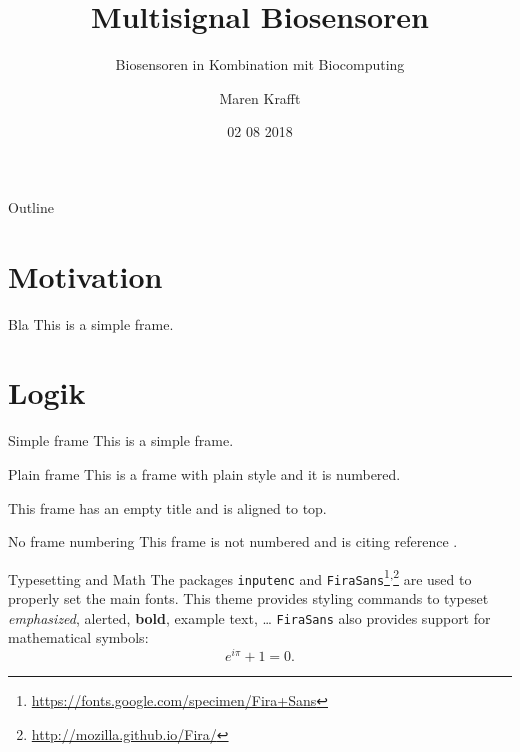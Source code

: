 \documentclass{beamer}
\title{Multisignal Biosensoren}
\subtitle{Biosensoren in Kombination mit Biocomputing}
\author{Maren Krafft}
\institute{Universit{\"A}t Passau \\ Lehrstuhl f{\"u}r technische Informatik}
\date{02 08 2018}
\begin{document}
    	\begin{frame}
        	\maketitle
    	\end{frame}
   
    \begin{frame}{Outline}
    \tableofcontents
	\end{frame}

 	\section{Motivation}
 	\begin{frame}{Bla}
 	This is a simple frame.
 	\end{frame}
 
 	\section{Logik}
    \begin{frame}{Simple frame}
        This is a simple frame.
    \end{frame}

    \begin{frame}{Plain frame}
        This is a frame with plain style and it is numbered.
    \end{frame}
    
    \begin{frame}[t]
        This frame has an empty title and is aligned to top.
    \end{frame}
    
    \begin{frame}[noframenumbering]{No frame numbering}
        This frame is not numbered and is citing reference \cite{knuth74}.
    \end{frame}
    
    \begin{frame}{Typesetting and Math}
        The packages \texttt{inputenc} and \texttt{FiraSans}\footnote{\url{https://fonts.google.com/specimen/Fira+Sans}}\textsuperscript{,}\footnote{\url{http://mozilla.github.io/Fira/}} are used to properly set the main fonts.
        \vfill
        This theme provides styling commands to typeset \emph{emphasized}, \alert{alerted}, \textbf{bold}, \textcolor{example}{example text}, \dots
        \vfill
        \texttt{FiraSans} also provides support for mathematical symbols:
        \begin{equation*}
            e^{i\pi} + 1 = 0.
        \end{equation*}
    \end{frame}
\end{document}

